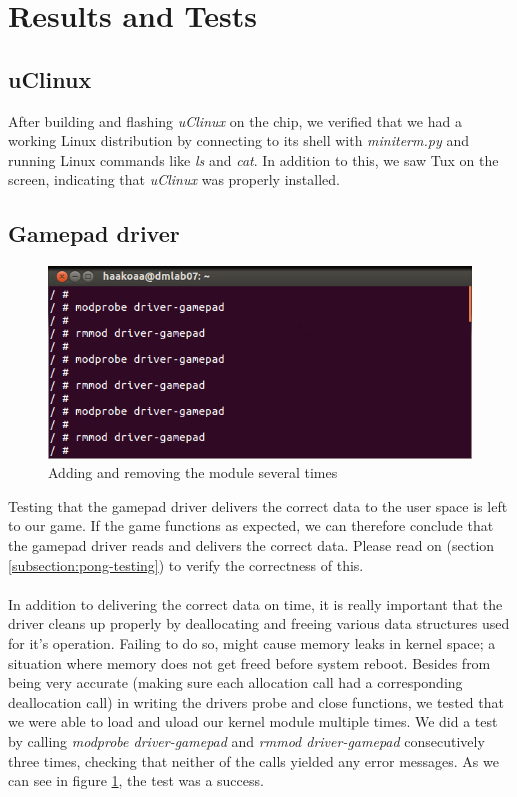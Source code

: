 \section{Results and Tests}


\subsection{uClinux}
After building and flashing \emph{uClinux} on the chip, we verified that we had a working Linux distribution by connecting to its shell with \emph{miniterm.py} and running Linux commands like \emph{ls} and \emph{cat}. In addition to this, we saw Tux on the screen, indicating that \emph{uClinux} was properly installed.

\subsection{Gamepad driver}
\begin{figure}[h]
	\centering
	\includegraphics[width=12cm]{img/modprobe.png}
	\caption{Adding and removing the module several times}
	\label{fig:modprobe}
\end{figure}
Testing that the gamepad driver delivers the correct data to the user space is left to our game. If the game functions as expected, we can therefore conclude that the gamepad driver reads and delivers the correct data. Please read on (section \ref{subsection:pong-testing}) to verify the correctness of this.\\
\\
In addition to delivering the correct data on time, it is really important that the driver cleans up properly by deallocating and freeing various data structures used for it's operation. Failing to do so, might cause memory leaks in kernel space; a situation where memory does not get freed before system reboot. Besides from being very accurate (making sure each allocation call had a corresponding deallocation call) in writing the drivers probe and close functions, we tested that we were able to load and uload our kernel module multiple times. We did a test by calling \emph{modprobe driver-gamepad} and \emph{rmmod driver-gamepad} consecutively three times, checking that neither of the calls yielded any error messages. As we can see in figure \ref{fig:modprobe}, the test was a success.

